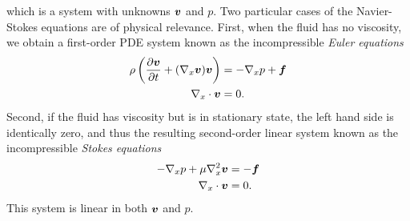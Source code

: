 \documentclass{article}
\renewcommand{\vec}{\vectorsym}
\newcommand{\vx}{\nabla_x}
\begin{document}
which is a system with unknowns $\vec v$ and $p$. Two particular cases of the Navier-Stokes equations are of physical relevance. First, when the fluid has no viscosity, we obtain a first-order PDE system known as the incompressible \textit{Euler equations}
\begin{align*}
    \rho\left(\frac{\partial \vec v}{\partial t} + (\vx\vec v)\vec v\right) &= -\vx p + \vec f\\
    \vx\cdot\vec v &= 0.
\end{align*} 
Second, if the fluid has viscosity but is in stationary state, the left hand side is identically zero, and thus the resulting second-order linear system known as the incompressible \textit{Stokes equations}
\begin{align*}
    -\vx p + \mu\vx^2 \vec v &= - \vec f\\
    \vx\cdot\vec v &= 0.
\end{align*} 
This system is linear in both $\vec v$ and $p$. 
\end{document}
